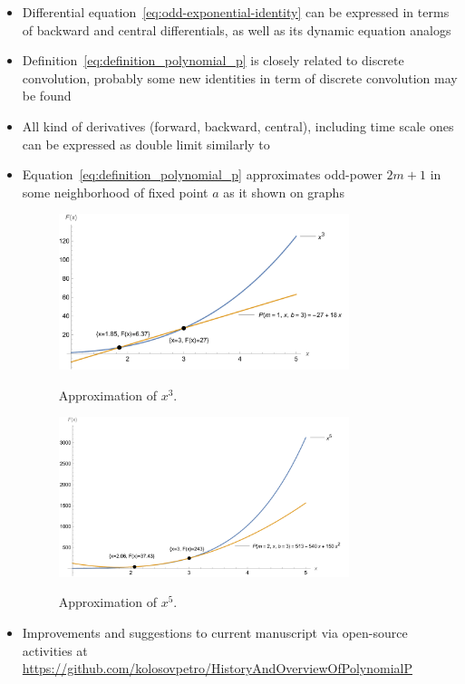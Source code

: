 ﻿\begin{itemize}
    \item Differential equation~\eqref{eq:odd-exponential-identity} can be expressed in terms of backward
    and central differentials, as well as its dynamic equation analogs~\cite{kolosov2016study}
    \item Definition~\eqref{eq:definition_polynomial_p} is closely related to discrete convolution, probably
    some new identities in term of discrete convolution may be found
    \item All kind of derivatives (forward, backward, central), including time scale ones can be expressed
    as double limit similarly to~\cite{kolosov_2024_10575485}
    \item Equation~\eqref{eq:definition_polynomial_p} approximates odd-power $2m+1$ in some neighborhood of fixed point
    $a$ as it shown on graphs
    \begin{figure}[H]
        \centering
        \includegraphics[width=0.8\textwidth]{images/n^3_approximation_m1_b3}
        ~\caption{Approximation of $x^3$.}\label{fig:approximation-n3}
    \end{figure}
    \begin{figure}[H]
        \centering
        \includegraphics[width=0.8\textwidth]{images/n^5_approximation_m2_b3}
        ~\caption{Approximation of $x^5$.}\label{fig:approximation-n5}
    \end{figure}
    \item Improvements and suggestions to current manuscript via open-source activities at
    \url{https://github.com/kolosovpetro/HistoryAndOverviewOfPolynomialP}
\end{itemize}

